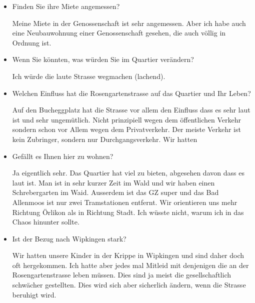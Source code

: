 \documentclass[a4paper,ngerman,11pt]{scrartcl}
\begin{document}
\begin{itemize}
\item Finden Sie ihre Miete angemessen?

Meine Miete in der Genossenschaft ist sehr angemessen. Aber ich habe auch
eine Neubauwohnung einer Genossenschaft gesehen, die auch völlig in Ordnung
ist.

\item Wenn Sie könnten, was würden Sie im Quartier verändern?

Ich würde die laute Strasse wegmachen (lachend).

\item Welchen Einfluss hat die Rosengartenstrasse auf das Quartier und Ihr Leben?

Auf den Bucheggplatz hat die Strasse vor allem den Einfluss dass es sehr
laut ist und sehr ungemütlich. Nicht prinzipiell wegen dem öffentlichen
Verkehr sondern schon vor Allem wegen dem Privatverkehr. Der meiste Verkehr
ist kein Zubringer, sondern nur Durchgangsverkehr. Wir hatten

\item Gefällt es Ihnen hier zu wohnen?

Ja eigentlich sehr. Das Quartier hat viel zu bieten, abgesehen davon dass es
laut ist. Man ist in sehr kurzer Zeit im Wald und wir haben einen
Schrebergarten im Waid. Ausserdem ist das GZ super und das Bad Allenmoos ist
nur zwei Tramstationen entfernt. Wir orientieren uns mehr Richtung Örlikon
als in Richtung Stadt. Ich wüsste nicht, warum ich in das Chaos hinunter
sollte.

\item Ist der Bezug nach Wipkingen stark?

Wir hatten unsere Kinder in der Krippe in Wipkingen und sind daher doch oft
hergekommen. Ich hatte aber jedes mal Mitleid mit denjenigen die an der
Rosengartenstrasse leben müssen. Dies sind ja meist die gesellschaftlich
schwächer gestellten. Dies wird sich aber sicherlich ändern, wenn die
Strasse beruhigt wird.
\end{itemize}
\end{document}
